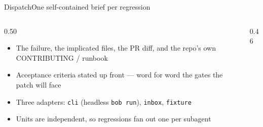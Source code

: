 \documentclass[aspectratio=169,10pt]{beamer}
\begin{document}
\begin{frame}{Dispatch}{One self-contained brief per regression}
\vspace{0.1cm}
\begin{columns}[T]
\begin{column}{0.50\textwidth}
\begin{itemize}\setlength\itemsep{0.45em}
  \item The failure, the implicated files, the PR diff, and the repo's own
        \textcolor{ink}{CONTRIBUTING / runbook}
  \item Acceptance criteria stated up front --- word for word the gates the patch will face
  \item Three adapters: \texttt{cli} (headless \texttt{bob run}), \texttt{inbox}, \texttt{fixture}
  \item Units are independent, so regressions fan out one per subagent
\end{itemize}
\end{column}
\begin{column}{0.46\textwidth}
\end{column}
\end{columns}
\end{frame}
\end{document}
